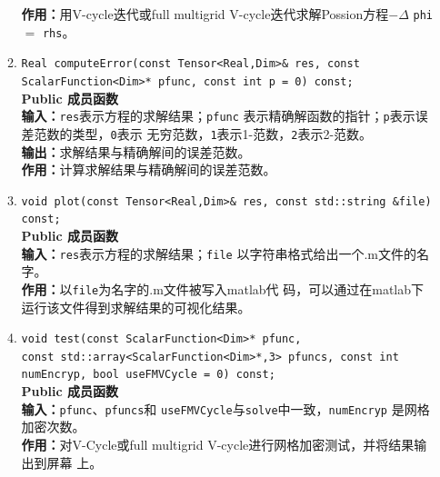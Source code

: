 \documentclass[a4paper,twoside]{ctexart}
\begin{document}
\begin{itemize}
\begin{enumerate}[(1)]
          \textbf{作用：}用V-cycle迭代或full
          multigrid V-cycle迭代求解Possion方程$-\Delta$ \texttt{phi} $=$
          \texttt{rhs}。
          \item \texttt{Real computeError(const Tensor<Real,Dim>\& res, const ScalarFunction<Dim>* pfunc,
                    const int p = 0) const;}\\
          \textbf{Public 成员函数}\\
          \textbf{输入：}\texttt{res}表示方程的求解结果；\texttt{pfunc}
          表示精确解函数的指针；\texttt{p}表示误差范数的类型，\texttt{0}表示
          无穷范数，\texttt{1}表示1-范数，\texttt{2}表示2-范数。\\
          \textbf{输出：}求解结果与精确解间的误差范数。\\
          \textbf{作用：}计算求解结果与精确解间的误差范数。
          \item \texttt{void plot(const Tensor<Real,Dim>\& res, const
              std::string \&file) const;}\\
          \textbf{Public 成员函数}\\
          \textbf{输入：}\texttt{res}表示方程的求解结果；\texttt{file}
          以字符串格式给出一个$.$m文件的名字。\\
          \textbf{作用：}以\texttt{file}为名字的$.$m文件被写入matlab代
          码，可以通过在matlab下运行该文件得到求解结果的可视化结果。
          \item \texttt{void test(const ScalarFunction<Dim>* pfunc,\\
            const std::array<ScalarFunction<Dim>*,3> pfuncs, const int
            numEncryp, bool useFMVCycle = 0) const;}\\
          \textbf{Public 成员函数}\\
          \textbf{输入：}\texttt{pfunc}、\texttt{pfuncs}和
          \texttt{useFMVCycle}与\texttt{solve}中一致，\texttt{numEncryp} 是网格加密次数。\\
          \textbf{作用：}对V-Cycle或full multigrid V-cycle进行网格加密测试，并将结果输出到屏幕
          上。
         
            \end{enumerate}
          \end{itemize}
          \newpage
\end{document}
